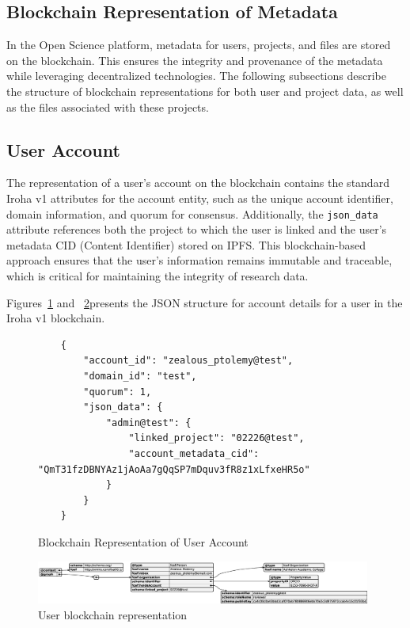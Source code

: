 \documentclass{article}
\begin{document}
\subsection{Blockchain Representation of Metadata}

In the Open Science platform, metadata for users, projects, and files are stored on the blockchain. This ensures the integrity and provenance of the metadata while leveraging decentralized technologies. The following subsections describe the structure of blockchain representations for both user and project data, as well as the files associated with these projects.

\subsection{User Account}

The representation of a user's account on the blockchain contains the standard Iroha v1 attributes for the account entity, such as the unique account identifier, domain information, and quorum for consensus. Additionally, the \texttt{json\_data} attribute references both the project to which the user is linked and the user's metadata CID (Content Identifier) stored on IPFS. This blockchain-based approach ensures that the user’s information remains immutable and traceable, which is critical for maintaining the integrity of research data.

Figures~\ref{fig:user_blockchain_representation} and ~\ref{fig:user_bct_rep}presents the JSON structure for account details for a user in the Iroha v1 blockchain.

\begin{figure}[h]
      \centering
      \caption{Blockchain Representation of User Account}
      \label{fig:user_blockchain_representation}
      \begin{verbatim}
    {
        "account_id": "zealous_ptolemy@test",
        "domain_id": "test",
        "quorum": 1,
        "json_data": {
            "admin@test": {
                "linked_project": "02226@test",
                "account_metadata_cid": "QmT31fzDBNYAz1jAoAa7gQqSP7mDquv3fR8z1xLfxeHR5o"
            }
        }
    }
    \end{verbatim}
\end{figure}



\begin{figure}[htbp]
      \centering
      \includegraphics[width=0.98\textwidth, keepaspectratio]{user_bct_representation.eps}
      \caption{User blockchain representation}
      \label{fig:user_bct_rep}
\end{figure}
\end{document}
